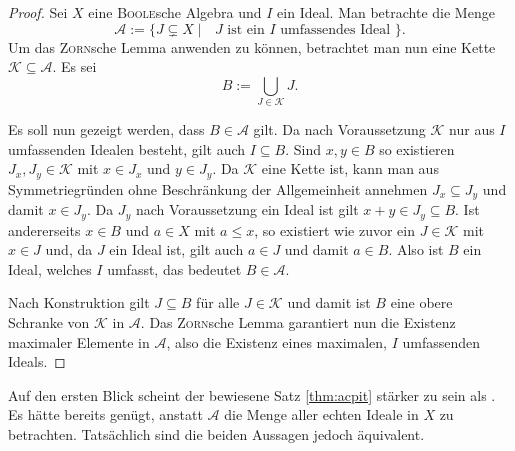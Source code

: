 \begin{proof}
  Sei $X$ eine \textsc{Boole}sche Algebra und $I$ ein Ideal. 
  Man betrachte die Menge
  \begin{displaymath}
    \mathcal{A} := \{J \subsetneq X \mid \text{ $J$ ist ein $I$ umfassendes Ideal } \}.
  \end{displaymath}
  Um das \textsc{Zorn}sche Lemma anwenden zu können, betrachtet man nun eine Kette $\mathcal{K} \subseteq \mathcal{A}$.
  Es sei 
  \begin{displaymath}
    B := \bigcup_{J \in \mathcal{K}} J.
  \end{displaymath}

  Es soll nun gezeigt werden, dass $B \in \mathcal{A}$ gilt.
  Da nach Voraussetzung $\mathcal{K}$ nur aus $I$ umfassenden Idealen besteht, gilt auch $I \subseteq B$.
  Sind $x,y \in B$ so existieren $J_x, J_y \in \mathcal{K}$ mit $x \in J_x$ und $y \in J_y$.
  Da $\mathcal{K}$ eine Kette ist, kann man aus Symmetriegründen ohne Beschränkung der Allgemeinheit annehmen $J_x \subseteq J_y$ und damit $x \in J_y$.
  Da $J_y$ nach Voraussetzung ein Ideal ist gilt $x + y \in J_y \subseteq B$.
  Ist andererseits $x \in B$ und $a \in X$ mit $a \leq x$, so existiert wie zuvor ein $J \in \mathcal{K}$ mit $x \in J$ und, da $J$ ein Ideal ist, gilt auch $a \in J$ und damit $a \in B$.
  Also ist $B$ ein Ideal, welches $I$ umfasst, das bedeutet $B \in \mathcal{A}$.

  Nach Konstruktion gilt $J \subseteq B$ für alle $J \in \mathcal{K}$ und damit ist $B$ eine obere Schranke von $\mathcal{K}$ in $\mathcal{A}$.
  Das \textsc{Zorn}sche Lemma garantiert nun die Existenz maximaler Elemente in $\mathcal{A}$, also die Existenz eines maximalen, $I$ umfassenden Ideals.
\end{proof}

\begin{bem}
  Auf den ersten Blick scheint der bewiesene Satz \ref{thm:acpit} stärker zu sein als \PIT.
  Es hätte bereits genügt, anstatt $\mathcal{A}$ die Menge aller echten Ideale in $X$ zu betrachten.
  Tatsächlich sind die beiden Aussagen jedoch äquivalent.
\end{bem}

